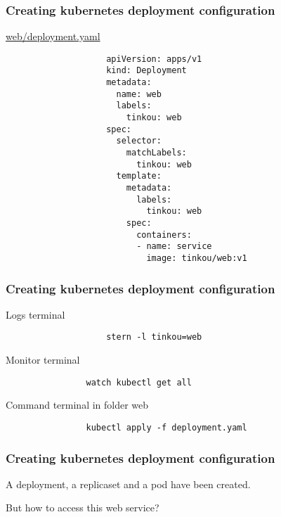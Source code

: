 	\begin{frame}[fragile]
		\frametitle{Creating kubernetes deployment configuration}
		\begin{block}{\href{https://github.com/Tinkou/trainings/blob/master/trainings/sources/dev-onboarding/files/web/deployment.yaml}{web/deployment.yaml}}
			\begin{tiny}
				\begin{verbatim}
					apiVersion: apps/v1
					kind: Deployment
					metadata:
					  name: web
					  labels:
					    tinkou: web
					spec:
					  selector:
					    matchLabels:
					      tinkou: web
					  template:
					    metadata:
					      labels:
					        tinkou: web
					    spec:
					      containers:
					      - name: service
					        image: tinkou/web:v1
				\end{verbatim}
			\end{tiny}
		\end{block}
	\end{frame}
	
	\begin{frame}[fragile]
		\frametitle{Creating kubernetes deployment configuration}

		\begin{block}{Logs terminal}
			\begin{small}
				\begin{verbatim}
					stern -l tinkou=web
				\end{verbatim}
			\end{small}
		\end{block}
		
		\begin{block}{Monitor terminal}
			\begin{verbatim}
				watch kubectl get all
			\end{verbatim}
		\end{block}
		
		\begin{block}{Command terminal in folder web}
			\begin{verbatim}
				kubectl apply -f deployment.yaml
			\end{verbatim}
		\end{block}
	\end{frame}
	
	\begin{frame}
		\frametitle{Creating kubernetes deployment configuration}
		
		A deployment, a replicaset and a pod have been created.
		
		\bigskip
		
		But how to access this web service?
	\end{frame}
	
